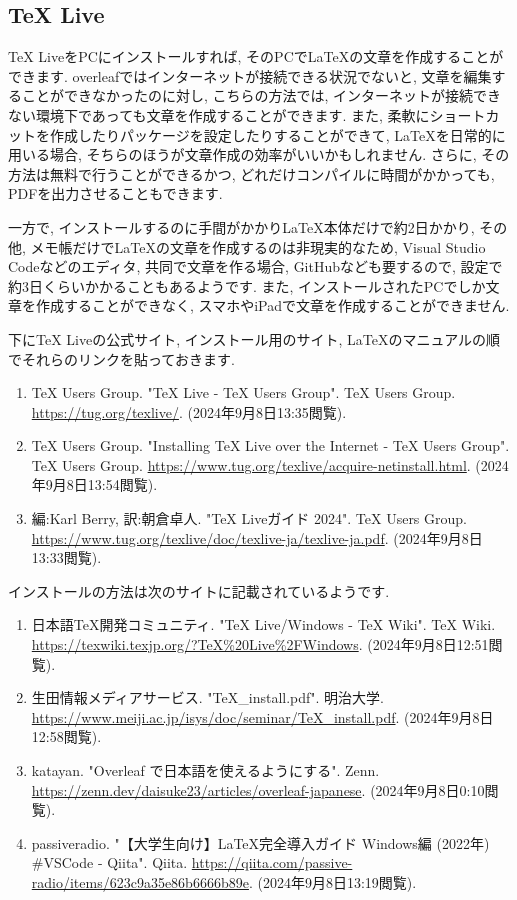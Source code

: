 \documentclass[10pt,a4paper]{jsarticle}
\begin{document}
\subsection{TeX Live}
TeX LiveをPCにインストールすれば, そのPCで\LaTeX の文章を作成することができます. overleafではインターネットが接続できる状況でないと, 文章を編集することができなかったのに対し, こちらの方法では, インターネットが接続できない環境下であっても文章を作成することができます. また, 柔軟にショートカットを作成したりパッケージを設定したりすることができて, \LaTeX を日常的に用いる場合, そちらのほうが文章作成の効率がいいかもしれません. さらに, その方法は無料で行うことができるかつ, どれだけコンパイルに時間がかかっても, PDFを出力させることもできます. \par
一方で, インストールするのに手間がかかり\LaTeX 本体だけで約2日かかり, その他, メモ帳だけで\LaTeX の文章を作成するのは非現実的なため, Visual Studio Codeなどのエディタ, 共同で文章を作る場合, GitHubなども要するので, 設定で約3日くらいかかることもあるようです. また, インストールされたPCでしか文章を作成することができなく, スマホやiPadで文章を作成することができません. \par
下にTeX Liveの公式サイト, インストール用のサイト, \LaTeX のマニュアルの順でそれらのリンクを貼っておきます. 
\begin{enumerate}
    \renewcommand{\labelenumi}{[\arabic{enumi}]\ }
    \setcounter{enumi}{11}
    \item TeX Users Group. "TeX Live - TeX Users Group". TeX Users Group. \url{https://tug.org/texlive/}. (2024年9月8日13:35閲覧). 
    \item TeX Users Group. "Installing TeX Live over the Internet - TeX Users Group". TeX Users Group. \url{https://www.tug.org/texlive/acquire-netinstall.html}. (2024年9月8日13:54閲覧). 
    \item 編:Karl Berry, 訳:朝倉卓人. "TeX Liveガイド 2024". TeX Users Group. \url{https://www.tug.org/texlive/doc/texlive-ja/texlive-ja.pdf}. (2024年9月8日13:33閲覧). 
\end{enumerate}
インストールの方法は次のサイトに記載されているようです. 
\begin{enumerate}
    \renewcommand{\labelenumi}{[\arabic{enumi}]\ }
    \setcounter{enumi}{14}
    \item 日本語TeX開発コミュニティ. "TeX Live/Windows - TeX Wiki". TeX Wiki. \url{https://texwiki.texjp.org/?TeX%20Live%2FWindows}. (2024年9月8日12:51閲覧). 
    \item 生田情報メディアサービス. "TeX\_install.pdf". 明治大学. \url{https://www.meiji.ac.jp/isys/doc/seminar/TeX_install.pdf}. (2024年9月8日12:58閲覧). 
    \item katayan. "Overleaf で日本語を使えるようにする". Zenn. \url{https://zenn.dev/daisuke23/articles/overleaf-japanese}. (2024年9月8日0:10閲覧). 
    \item passiveradio. "【大学生向け】LaTeX完全導入ガイド Windows編 (2022年) \#VSCode - Qiita". Qiita. \url{https://qiita.com/passive-radio/items/623c9a35e86b6666b89e}. (2024年9月8日13:19閲覧). 
\end{enumerate}
\end{document}
